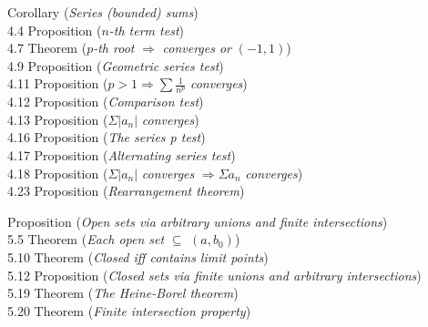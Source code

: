 \documentclass[12pt]{article}
\begin{document}
 Corollary (\emph{Series (bounded) sums})  \\
4.4 Proposition ($n$\emph{-th term test})  \\
4.7 Theorem ($p$\emph{-th root} $\Rightarrow$ \emph{converges or} $(-1, 1)$)  \\
4.9 Proposition (\emph{Geometric series test})  \\
4.11 Proposition ($p > 1 \Rightarrow \sum \frac{1}{n^p}$ \emph{converges})  \\
4.12 Proposition (\emph{Comparison test})  \\
4.13 Proposition ($\Sigma |a_n|$ \emph{converges})  \\
4.16 Proposition (\emph{The series p test})  \\
4.17 Proposition (\emph{Alternating series test})  \\
4.18 Proposition ($\Sigma |a_n|$ \emph{converges} $\Rightarrow \Sigma a_n$ \emph{converges})  \\
4.23 Proposition (\emph{Rearrangement theorem})  \\

\vspace{0.5em}

 Proposition (\emph{Open sets via arbitrary unions and finite intersections})  \\
5.5 Theorem (\emph{Each open set} $\subseteq$ $(a, b_0)$)  \\
5.10 Theorem (\emph{Closed iff contains limit points})  \\
5.12 Proposition (\emph{Closed sets via finite unions and arbitrary intersections})  \\
5.19 Theorem (\emph{The Heine-Borel theorem})  \\
5.20 Theorem (\emph{Finite intersection property})  \\

\vspace{0.5em}
\end{document}
